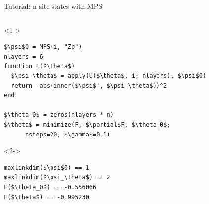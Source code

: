 \begin{frame}[fragile]{Tutorial: n-site states with MPS}

\begin{columns}

\begin{column}{5.5cm}

\begin{onlyenv}<1->
\begin{lstlisting}[language=JuliaLocal, style=julia, mathescape, basicstyle=\scriptsize\ttfamily]
$\psi$0 = MPS(i, "Zp")
nlayers = 6
function F($\theta$)
  $\psi_\theta$ = apply(U($\theta$, i; nlayers), $\psi$0)
  return -abs(inner($\psi$', $\psi_\theta$))^2
end

$\theta_0$ = zeros(nlayers * n)
$\theta$ = minimize(F, $\partial$F, $\theta_0$;
      nsteps=20, $\gamma$=0.1)
\end{lstlisting}
\end{onlyenv}


\begin{onlyenv}<2->
\begin{lstlisting}[language=JuliaLocal, style=julia, mathescape, basicstyle=\scriptsize\ttfamily]
maxlinkdim($\psi$0) == 1
maxlinkdim($\psi_\theta$) == 2
F($\theta_0$) == -0.556066
F($\theta$) == -0.995230
\end{lstlisting}
\end{onlyenv}

\end{column}

\begin{column}{4.5cm}



\end{column}
\end{columns}
\end{frame}
